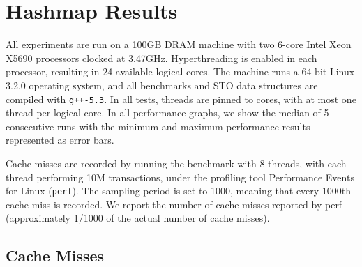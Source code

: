 \chapter{Hashmap Results}
\label{app:hashmaps}

All experiments are run on a 100GB DRAM machine with two 6-core Intel Xeon X5690 processors clocked at 3.47GHz. Hyperthreading is enabled in each processor, resulting in 24 available logical cores. The machine runs a 64-bit Linux 3.2.0 operating system, and all benchmarks and STO data structures are compiled with \texttt{g++-5.3}. In all tests, threads are pinned to cores, with at most one thread per logical core.
In all performance graphs, we show the median of 5 consecutive runs with the minimum and maximum performance results represented as error bars.

Cache misses are recorded by running the benchmark with 8 threads, with each thread performing 10M transactions, under the profiling tool Performance Events for Linux (\texttt{perf}). The sampling period is set to 1000, meaning that every 1000th cache miss is recorded.
We report the number of cache misses reported by perf (approximately 1/1000 of the actual number of cache misses).

\section{Cache Misses}

